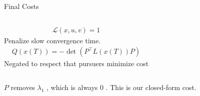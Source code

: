 \begin{frame}{Final Costs}
    \begin{columns}
        \begin{align*}
            \mathcal{L}(x, u, v) = 1
        \end{align*}
        Penalize slow convergence time.
        \begin{align*}
            Q(x(T)) = -\det(P^\top L(x(T)) P)
        \end{align*}
        Negated to respect that pursuers minimize cost
    \end{columns}
    \vspace{20pt}
    \center
    $P$ removes $\lambda_1$ \cite{pot-fields}, which is always 0 \cite[27]{graph-theory}.
    This is our closed-form cost.
\end{frame}

